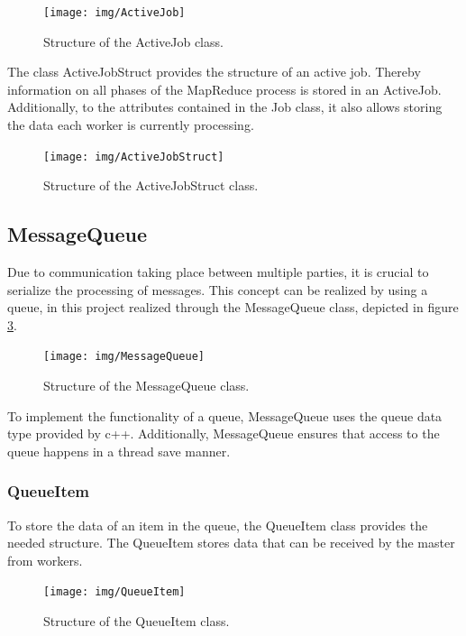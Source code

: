 \documentclass[12pt, letterpaper]{article}
\begin{document}
\begin{figure}[h]
	\centering
	\texttt{[image: img/ActiveJob]}
	\caption{Structure of the ActiveJob class.}
	\label{fig:classes_ActiveJob}
\end{figure}

The class ActiveJobStruct provides the structure of an active job. Thereby information on all phases of the MapReduce process is stored in an ActiveJob. Additionally, to the attributes contained in the Job class, it also allows storing the data each worker is currently processing.

\begin{figure}[h]
	\centering
	\texttt{[image: img/ActiveJobStruct]}
	\caption{Structure of the ActiveJobStruct class.}
	\label{fig:classes_ActiveJobStruct}
\end{figure}
\pagebreak

\subsection{MessageQueue}

Due to communication taking place between multiple parties, it is crucial to serialize the processing of messages. This concept can be realized by using a queue, in this project realized through the MessageQueue class, depicted in figure \ref{fig:classes_MessageQueue}.

\begin{figure}[h]
	\centering
	\texttt{[image: img/MessageQueue]}
	\caption{Structure of the MessageQueue class.}
	\label{fig:classes_MessageQueue}
\end{figure}

To implement the functionality of a queue, MessageQueue uses the queue data type provided by c++. Additionally, MessageQueue ensures that access to the queue happens in a thread save manner. 

\subsubsection{QueueItem}

To store the data of an item in the queue, the QueueItem class provides the needed structure. 
The QueueItem stores data that can be received by the master from workers.

\begin{figure}[h]
	\centering
	\texttt{[image: img/QueueItem]}
	\caption{Structure of the QueueItem class.}
	\label{fig:classes_QueueItem}
\end{figure}
\end{document}
